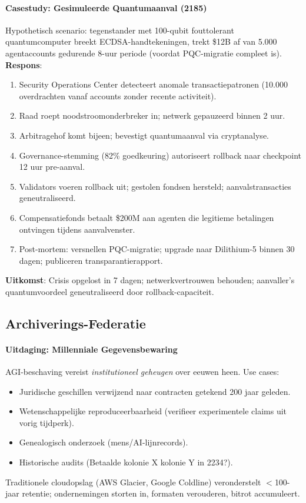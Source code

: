 \documentclass[11pt]{article}
\begin{document}
\paragraph{Casestudy: Gesimuleerde Quantumaanval (2185)}
Hypothetisch scenario: tegenstander met 100-qubit fouttolerant quantumcomputer breekt ECDSA-handtekeningen, trekt \$12B af van 5.000 agentaccounts gedurende 8-uur periode (voordat PQC-migratie compleet is).\\
\textbf{Respons}:
\begin{enumerate}[noitemsep]
  \item Security Operations Center detecteert anomale transactiepatronen (10.000 overdrachten vanaf accounts zonder recente activiteit).
  \item Raad roept noodstroomonderbreker in; netwerk gepauzeerd binnen 2 uur.
  \item Arbitragehof komt bijeen; bevestigt quantumaanval via cryptanalyse.
  \item Governance-stemming (82\% goedkeuring) autoriseert rollback naar checkpoint 12 uur pre-aanval.
  \item Validators voeren rollback uit; gestolen fondsen hersteld; aanvalstransacties geneutraliseerd.
  \item Compensatiefonds betaalt \$200M aan agenten die legitieme betalingen ontvingen tijdens aanvalvenster.
  \item Post-mortem: versnellen PQC-migratie; upgrade naar Dilithium-5 binnen 30 dagen; publiceren transparantierapport.
\end{enumerate}
\textbf{Uitkomst}: Crisis opgelost in 7 dagen; netwerkvertrouwen behouden; aanvaller's quantumvoordeel geneutraliseerd door rollback-capaciteit.

\subsection{Archiverings-Federatie}

\paragraph{Uitdaging: Millenniale Gegevensbewaring}
AGI-beschaving vereist \emph{institutioneel geheugen} over eeuwen heen. Use cases:
\begin{itemize}[noitemsep]
  \item Juridische geschillen verwijzend naar contracten getekend 200 jaar geleden.
  \item Wetenschappelijke reproduceerbaarheid (verifieer experimentele claims uit vorig tijdperk).
  \item Genealogisch onderzoek (mens/AI-lijnrecords).
  \item Historische audits (Betaalde kolonie X kolonie Y in 2234?).
\end{itemize}
Traditionele cloudopslag (AWS Glacier, Google Coldline) veronderstelt $<$100-jaar retentie; ondernemingen storten in, formaten verouderen, bitrot accumuleert.
\end{document}
